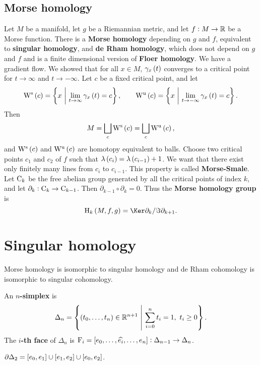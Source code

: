 \subsection{Morse homology}

Let $ M $ be a manifold, let $ g $ be a Riemannian metric, and let $ f : M \to \mathbb{R} $ be a Morse function. There is a \textbf{Morse homology} depending on $ g $ and $ f $, equivalent to \textbf{singular homology}, and \textbf{de Rham homology}, which does not depend on $ g $ and $ f $ and is a finite dimensional version of \textbf{Floer homology}. We have a gradient flow. We showed that for all $ x \in M $, $ \gamma_x\br{t} $ converges to a critical point for $ t \to \infty $ and $ t \to -\infty $. Let $ c $ be a fixed critical point, and let
$$ \W^\s\br{c} = \cbr{x \st \lim_{t \to \infty} \gamma_x\br{t} = c}, \qquad \W^\u\br{c} = \cbr{x \st \lim_{t \to -\infty} \gamma_x\br{t} = c}. $$
Then
$$ M = \bigsqcup_c \W^\s\br{c} = \bigsqcup_c \W^\u\br{c}, $$
and $ \W^\s\br{c} $ and $ \W^\u\br{c} $ are homotopy equivalent to balls. Choose two critical points $ c_1 $ and $ c_2 $ of $ f $ such that $ \lambda\br{c_i} = \lambda\br{c_{i - 1}} + 1 $. We want that there exist only finitely many lines from $ c_i $ to $ c_{i - 1} $. This property is called \textbf{Morse-Smale}. Let $ \mathrm{C}_k $ be the free abelian group generated by all the critical points of index $ k $, and let $ \partial_k : \mathrm{C}_k \to \mathrm{C}_{k - 1} $. Then $ \partial_{k - 1} \circ \partial_k = 0 $. Thus the \textbf{Morse homology group} is
$$ \H_k\br{M, f, g} = \Ker \partial_k / \Im \partial_{k + 1}. $$

\pagebreak

\section{Singular homology}


Morse homology is isomorphic to singular homology and de Rham cohomology is isomorphic to singular cohomology.

\begin{definition}
An \textbf{$ n $-simplex} is
$$ \Delta_n = \cbr{\br{t_0, \dots, t_n} \in \RR^{n + 1} \st \sum_{i = 0}^n t_i = 1, \ t_i \ge 0}. $$
The \textbf{$ i $-th face} of $ \Delta_n $ is $ \F_i = \sbr{e_0, \dots, \widehat{e_i}, \dots, e_n} : \Delta_{n - 1} \to \Delta_n $.
\end{definition}

\begin{example}
$ \partial\Delta_2 = \sbr{e_0, e_1} \cup \sbr{e_1, e_2} \cup \sbr{e_0, e_2} $.
\end{example}

